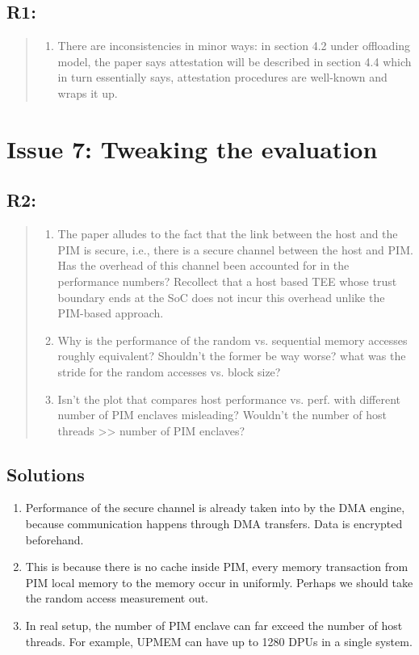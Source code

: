 \documentclass[11pt]{article}
\begin{document}
\subsection{R1:}
\label{sec:org8e08fa9}
\begin{quote}
\begin{enumerate}
\item There are inconsistencies in minor ways: in section 4.2 under offloading model, the paper says attestation will be described in section 4.4 which in turn essentially says, attestation procedures are well-known and wraps it up.
\end{enumerate}
\end{quote}
\section{Issue 7: Tweaking the evaluation}
\label{sec:org39ceec8}
\subsection{R2:}
\label{sec:org6120d24}
\begin{quote}
\begin{enumerate}
\item The paper alludes to the fact that the link between the host and the PIM is secure, i.e., there is a secure channel between the host and PIM. Has the overhead of this channel been accounted for in the performance numbers? Recollect that a host based TEE whose trust boundary ends at the SoC does not incur this overhead unlike the PIM-based approach.
\item Why is the performance of the random vs. sequential memory accesses roughly equivalent? Shouldn't the former be way worse? what was the stride for the random accesses vs. block size?
\item Isn't the plot that compares host performance vs. perf. with different number of PIM enclaves misleading? Wouldn't the number of host threads >> number of PIM enclaves?
\end{enumerate}
\end{quote}
\subsection{Solutions}
\label{sec:orge7c3cba}
\begin{enumerate}
\item Performance of the secure channel is already taken into by the DMA engine, because communication happens through DMA transfers. Data is encrypted beforehand.
\item This is because there is no cache inside PIM, every memory transaction from PIM local memory to the memory occur in uniformly. Perhaps we should take the random access measurement out.
\item In real setup, the number of PIM enclave can far exceed the number of host threads. For example, UPMEM can have up to 1280 DPUs in a single system.
\end{enumerate}
\end{document}
